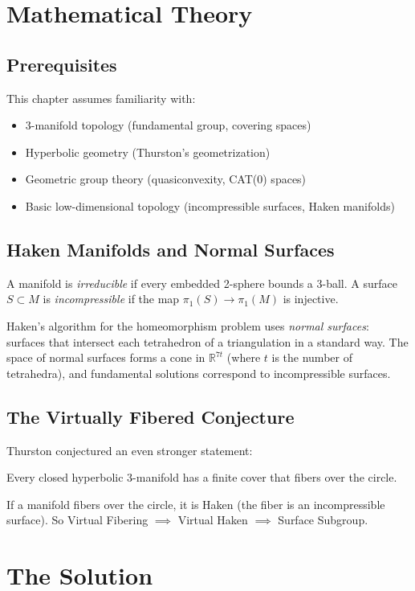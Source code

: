 \section{Mathematical Theory}


\subsection{Prerequisites}
This chapter assumes familiarity with:
\begin{itemize}
\item 3-manifold topology (fundamental group, covering spaces)
\item Hyperbolic geometry (Thurston's geometrization)
\item Geometric group theory (quasiconvexity, CAT(0) spaces)
\item Basic low-dimensional topology (incompressible surfaces, Haken manifolds)
\end{itemize}

\subsection{Haken Manifolds and Normal Surfaces}
A manifold is \emph{irreducible} if every embedded 2-sphere bounds a 3-ball. A surface $S \subset M$ is \emph{incompressible} if the map $\pi_1(S) \to \pi_1(M)$ is injective.

Haken's algorithm for the homeomorphism problem uses \emph{normal surfaces}: surfaces that intersect each tetrahedron of a triangulation in a standard way. The space of normal surfaces forms a cone in $\mathbb{R}^{7t}$ (where $t$ is the number of tetrahedra), and fundamental solutions correspond to incompressible surfaces.

\subsection{The Virtually Fibered Conjecture}
Thurston conjectured an even stronger statement:

\begin{conjecture}
Every closed hyperbolic 3-manifold has a finite cover that fibers over the circle.
\end{conjecture}

If a manifold fibers over the circle, it is Haken (the fiber is an incompressible surface). So Virtual Fibering $\implies$ Virtual Haken $\implies$ Surface Subgroup.

\section{The Solution}

